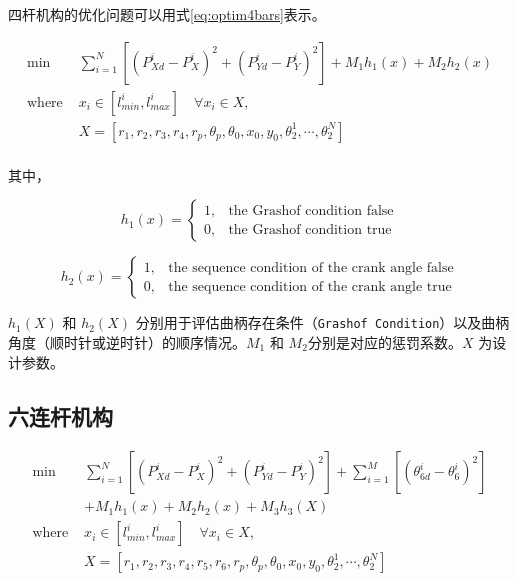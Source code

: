 \documentclass[]{ctexbook}
\theoremstyle{definition}
\theoremstyle{definition}
\theoremstyle{definition}
\theoremstyle{remark}
\begin{document}
四杆机构的优化问题可以用式\eqref{eq:optim4bars}表示。

\begin{equation}
\begin{split}
\text{min   } &\sum_{i=1}^N[(P_{Xd}^i-P_X^i)^2+(P_{Yd}^i-P_Y^i)^2]+M_1h_1(x)+M_2h_2(x)\\
\text{where } & x_i\in [l_{min}^i,l_{max}^i] \quad \forall x_i \in X,\\
&X=[r_1,r_2,r_3,r_4,r_p,\theta_p,\theta_0,x_0,y_0,\theta_2^1,\cdots,\theta_2^N]\\
\end{split}
\label{eq:optim4bars}
\end{equation}

其中，

\begin{equation}
h_1(x) = \begin{cases}
1, & \text{the Grashof condition false}\\
0, & \text{the Grashof condition true}
\end{cases}
\label{eq:hx1}
\end{equation}

\begin{equation}
h_2(x) = \begin{cases}
1, & \text{the sequence condition of the crank angle false}\\
0, & \text{the sequence condition of the crank angle true}
\end{cases}
\label{eq:hx2}
\end{equation}

\(h_1(X)\) 和 \(h_2(X)\)
分别用于评估曲柄存在条件（\texttt{Grashof\ Condition}）以及曲柄角度（顺时针或逆时针）的顺序情况。\(M_1\)
和 \(M_2\)分别是对应的惩罚系数。\(X\) 为设计参数。

\subsection{六连杆机构}\label{bars6optim}

\begin{equation}
\begin{split}
\text{min   } &\sum_{i=1}^N[(P_{Xd}^i-P_X^i)^2+(P_{Yd}^i-P_Y^i)^2]+\sum_{i=1}^M[(\theta_{6d}^i-\theta_6^i)^2]\\
&+M_1h_1(x)+M_2h_2(x)+M_3h_3(X)\\
\text{where } & x_i\in [l_{min}^i,l_{max}^i] \quad \forall x_i \in X,\\
&X=[r_1,r_2,r_3,r_4,r_5,r_6,r_p,\theta_p,\theta_0,x_0,y_0,\theta_2^1,\cdots,\theta_2^N]\\
\end{split}
\label{eq:optim6bars}
\end{equation}
\end{document}
